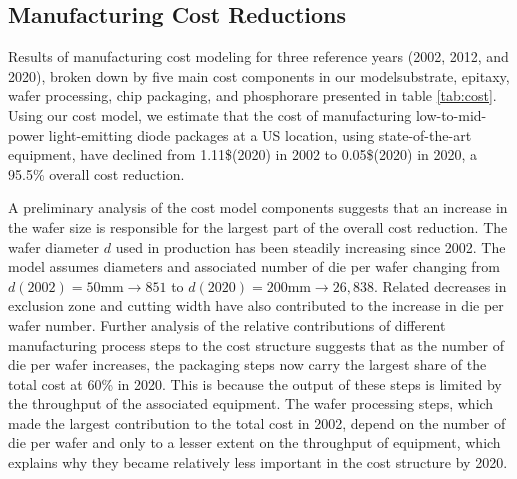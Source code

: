 \documentclass[a4paper,nocompress]{spie}  %
\begin{document}
\subsection{Manufacturing Cost Reductions}
    
    Results of manufacturing cost modeling for three reference years (2002, 2012, and 2020), broken down by five main cost components in our model\textemdash substrate, epitaxy, wafer processing, chip packaging, and phosphor\textemdash are presented in table \ref{tab:cost}. Using our cost model, we estimate that the cost of manufacturing low-to-mid-power light-emitting diode packages at a US location, using state-of-the-art equipment, have declined from 1.11\$(2020) in 2002 to 0.05\$(2020) in 2020, a 95.5\% overall cost reduction. 
    
    A preliminary analysis of the cost model components suggests that an increase in the wafer size is responsible for the largest part of the overall cost reduction. The wafer diameter $d$ used in production has been steadily increasing since 2002. The model assumes diameters and associated number of die per wafer changing from $d(2002)=50$mm$\rightarrow851$ to $d(2020)=200$mm$\rightarrow26,838$. Related decreases in exclusion zone and cutting width have also contributed to the increase in die per wafer number. Further analysis of the relative contributions of different manufacturing process steps to the cost structure suggests that as the number of die per wafer increases, the packaging steps now carry the largest share of the total cost at 60\% in 2020. This is because the output of these steps is limited by the throughput of the associated equipment. The wafer processing steps, which made the largest contribution to the total cost in 2002, depend on the number of die per wafer and only to a lesser extent on the throughput of equipment, which explains why they became relatively less important in the cost structure by 2020.
    
\end{document}
